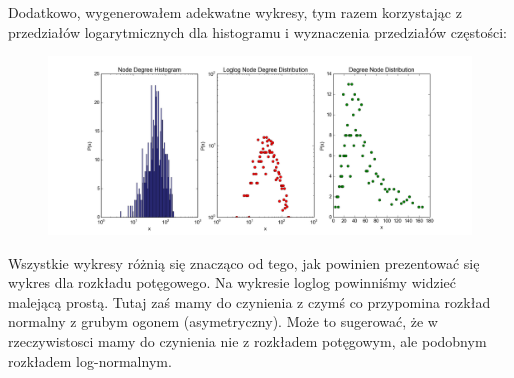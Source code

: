 \documentclass[a4paper,10pt]{article}
\begin{document}
		Dodatkowo, wygenerowałem adekwatne wykresy, tym razem korzystając z przedziałów logarytmicznych dla histogramu i wyznaczenia przedziałów częstości:
		\begin{figure}[H]
			\raggedleft
			\includegraphics[width=\linewidth, trim=50pt 30pt 50pt 25pt, clip]{figure_2}
			\hfill
		\end{figure}
		Wszystkie wykresy różnią się znacząco od tego, jak powinien prezentować się wykres dla rozkładu potęgowego. Na wykresie loglog powinniśmy widzieć malejącą prostą. Tutaj zaś mamy do czynienia z czymś co przypomina rozkład normalny z grubym ogonem (asymetryczny). Może to sugerować, że w rzeczywistosci mamy do czynienia nie z rozkładem potęgowym, ale podobnym rozkładem log-normalnym.
\end{document}
